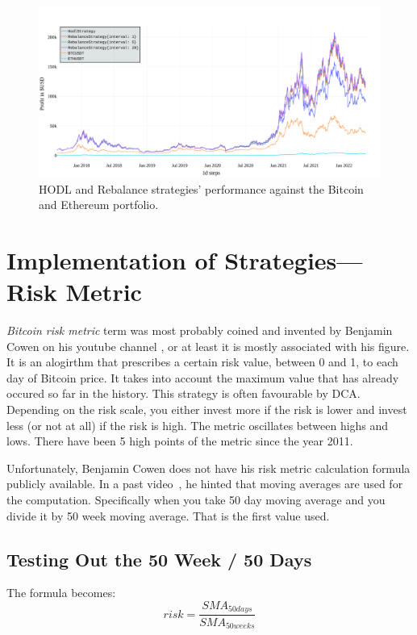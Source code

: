 \begin{figure}[!hbt]
    \centering
    \includegraphics[width=\columnwidth]{figures/benchmark.pdf}
    \caption{HODL and Rebalance strategies' performance against the Bitcoin and Ethereum portfolio.}
    \label{figure-benchmark}
\end{figure}


\section{Implementation of Strategies---Risk Metric}
\label{section-strategies}
\emph{Bitcoin risk metric} term was most probably coined and invented by Benjamin Cowen on his youtube channel \cite{youtube:cowen-yt-channel}, or at least it is mostly associated with his figure. It is an alogirthm that prescribes a certain risk value, between 0 and 1, to each day of Bitcoin price. It takes into account the maximum value that has already occured so far in the history. This strategy is often favourable by DCA. Depending on the risk scale, you either invest more if the risk is lower and invest less (or not at all) if the risk is high. The metric oscillates between highs and lows. There have been 5 high points of the metric since the year 2011.

Unfortunately, Benjamin Cowen does not have his risk metric calculation formula publicly available. In a past video~\cite{youtube:cowen-moving-average}, he hinted that moving averages are used for the computation. Specifically when you take 50 day moving average and you divide it by 50 week moving average. That is the first value used.

\subsection*{Testing Out the 50 Week / 50 Days}
\label{subsection-50week50days}
The formula becomes:
$$risk = \frac{\mathit{SMA}_{50 days}}{\mathit{SMA}_{50 weeks}}$$

